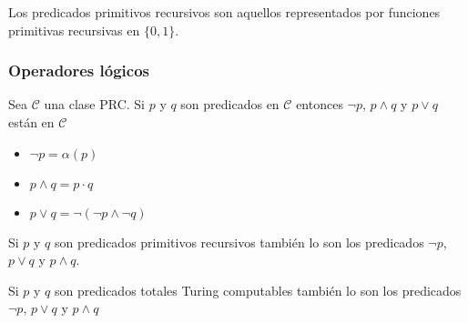 	Los predicados primitivos recursivos son aquellos representados por funciones primitivas recursivas en $\{0,1\}$.
	

	\subsubsection{Operadores lógicos}
	\begin{teorema}
	Sea $\mathcal{C}$ una clase PRC. Si $p$ y $q$ son predicados en $\mathcal{C}$ entonces $\lnot p$, $p\land q$ y $p\lor q$ están en $\mathcal{C}$
	\end{teorema}

	\begin{demo}
	\begin{itemize}
	\item $\lnot p = \alpha(p)$
	\item $p\land q = p \cdot q$
	\item $p \lor q = \lnot(\lnot p \land \lnot q)$ 
	\end{itemize}
	\end{demo}
	
	\begin{corolario}
	Si $p$ y $q$ son predicados primitivos recursivos también lo son los predicados $\lnot p$, $p\lor q$ y $p\land q$.
	\end{corolario}
	
	\begin{corolario}
Si $p$ y $q$ son predicados totales Turing computables también lo son los predicados $\lnot p$, $p\lor q$ y $p\land q$
		\end{corolario}
	
